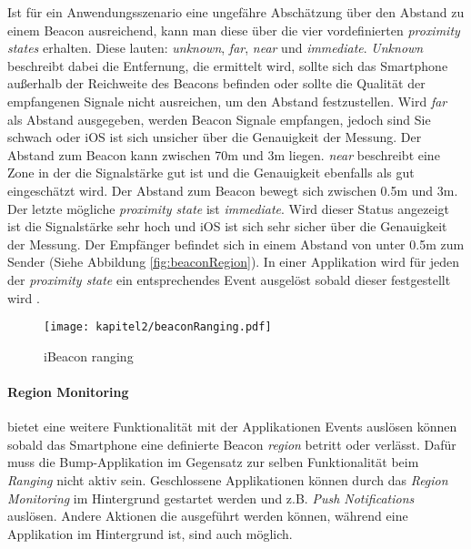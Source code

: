 Ist für ein Anwendungsszenario eine ungefähre Abschätzung über den Abstand zu einem Beacon ausreichend, kann man diese über die vier vordefinierten \textit{proximity states} erhalten. Diese lauten: \textit{unknown}, \textit{far}, \textit{near} und \textit{immediate}. \textit{Unknown} beschreibt dabei die Entfernung, die ermittelt wird, sollte sich das Smartphone außerhalb der Reichweite des Beacons befinden oder sollte die Qualität der empfangenen Signale nicht ausreichen, um den Abstand festzustellen. Wird \textit{far} als Abstand ausgegeben, werden Beacon Signale empfangen, jedoch sind Sie schwach oder \acs{iOS} ist sich unsicher über die Genauigkeit der Messung. Der Abstand zum Beacon kann zwischen 70m und 3m liegen. \textit{near} beschreibt eine Zone in der die Signalstärke gut ist und die Genauigkeit ebenfalls als gut eingeschätzt wird. Der Abstand zum Beacon bewegt sich zwischen 0.5m und 3m. Der letzte mögliche \textit{proximity state} ist \textit{immediate}. Wird dieser Status angezeigt ist die Signalstärke sehr hoch und \acs{iOS} ist sich sehr sicher über die Genauigkeit der Messung. Der Empfänger befindet sich in einem Abstand von unter 0.5m zum Sender (Siehe Abbildung \ref{fig:beaconRegion}). In einer Applikation wird für jeden der \textit{proximity state} ein entsprechendes Event ausgelöst sobald dieser festgestellt wird \cite{EstimoteBeaconSignal:Online}.

\begin{figure}[H] 
\centering 
  \texttt{[image: kapitel2/beaconRanging.pdf]}
\caption{iBeacon ranging} 
\end{figure}

\paragraph{Region Monitoring} bietet eine weitere Funktionalität mit der Applikationen Events auslösen können sobald das Smartphone eine definierte Beacon \textit{region} betritt oder verlässt. Dafür muss die Bump-Applikation im Gegensatz zur selben Funktionalität beim \textit{Ranging} nicht aktiv sein. Geschlossene Applikationen können durch das \textit{Region Monitoring} im Hintergrund gestartet werden und z.B. \textit{Push Notifications} auslösen. Andere Aktionen die ausgeführt werden können, während eine Applikation im Hintergrund ist, sind auch möglich.

